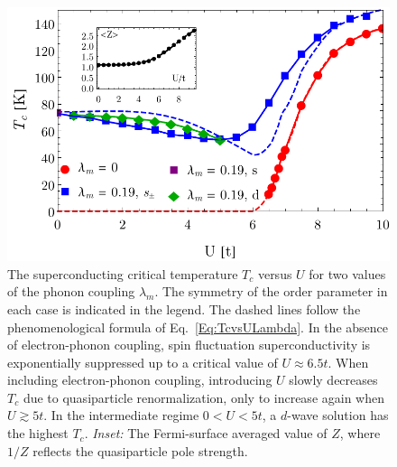 \documentclass[%
 reprint,
 superscriptaddress,
nofootinbib,
nobibnotes,
 amsmath,amssymb,
 aps,
 prb,
 dvipsnames, 
 floatfix
]{revtex4-2}
\begin{document}
\begin{figure}[t]
    \centering
    \includegraphics[width=\columnwidth]{figures/Figure3.pdf}
    \caption{The superconducting critical temperature $T_c$ versus $U$ for two values of the phonon coupling $\lambda_m$. The symmetry of the order parameter in each case is indicated in the legend. 
    The dashed lines follow the phenomenological formula of Eq.~\eqref{Eq:TcvsULambda}. In the absence of electron-phonon coupling, spin fluctuation superconductivity is exponentially suppressed up to a critical value of $U\approx 6.5t$. When including electron-phonon coupling, introducing $U$ slowly decreases $T_c$ due to quasiparticle renormalization, only to increase again when $U \gtrsim 5t$. In the intermediate regime $0 < U < 5t$, a $d$-wave solution has the highest $T_c$. {\em Inset:} The Fermi-surface averaged value of $Z$, where $1/Z$ reflects the quasiparticle pole strength.}
    \label{Fig:FigTcvsU}
\end{figure}
\end{document}
